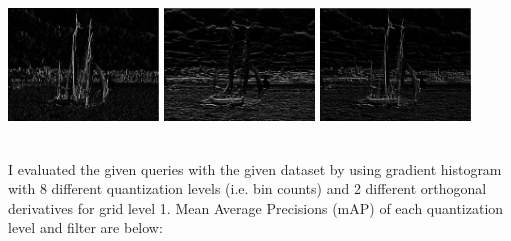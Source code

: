 \documentclass[12pt]{article}
\begin{document}
\begin{minipage}{\textwidth}
	\centering
	\includegraphics[width=0.3\textwidth]{IAcBBqAmEI_horizontal-1.jpeg}
	\includegraphics[width=0.3\textwidth]{IAcBBqAmEI_vertical-1.jpeg}
	\includegraphics[width=0.3\textwidth]{IAcBBqAmEI_blended-1.jpeg}
	\captionsetup{width=.8\textwidth}
\end{minipage} \\

\qquad I evaluated the given queries with the given dataset by using gradient histogram with 8 different quantization levels (i.e. bin counts) and 2 different orthogonal derivatives for grid level 1. Mean Average Precisions (mAP) of each quantization level and filter are below: \\
\end{document}
